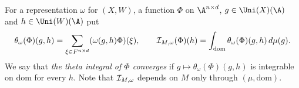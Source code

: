 \begin{definition}\label{pf:thmK:def:theta}
For a representation $\omega$ for $(X,W)$, a function $\Phi$ on $\A^{n\times d}$, $g\in\Uni(X)(\A)$ and
$h\in\Uni(W)(\A)$ put
\begin{equation}\label{pf:thmK:eq:theta}
\theta_\omega(\Phi)(g,h)=\sum_{\xi\in F^{n\times d}}(\omega(g,h)\Phi)(\xi),\qquad
\mathcal{I}_{M,\omega}(\Phi)(h)=\int_{\mathrm{dom}}\theta_\omega(\Phi)(g,h)\,d\mu(g).
\end{equation}
We say that \emph{the theta integral of $\Phi$ converges} if $g\mapsto\theta_\omega(\Phi)(g,h)$ is integrable on
$\mathrm{dom}$ for every $h$. Note that $\mathcal{I}_{M,\omega}$ depends on $M$ only through $(\mu,\mathrm{dom})$.
\end{definition}

